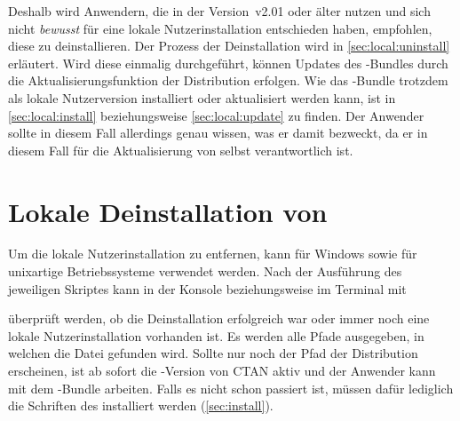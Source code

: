 Deshalb wird Anwendern, die \TUDScript in der Version~v2.01 oder älter nutzen 
und sich nicht \emph{bewusst} für eine lokale Nutzerinstallation entschieden 
haben, empfohlen, diese zu deinstallieren. Der Prozess der Deinstallation wird 
in \autoref{sec:local:uninstall} erläutert. Wird diese einmalig durchgeführt, 
können Updates des \TUDScript-Bundles durch die Aktualisierungsfunktion der 
Distribution erfolgen. Wie das \TUDScript-Bundle trotzdem als lokale 
Nutzerversion installiert oder aktualisiert werden kann, ist in 
\autoref{sec:local:install} beziehungsweise \autoref{sec:local:update} zu 
finden. Der Anwender sollte in diesem Fall allerdings genau wissen, was er 
damit bezweckt, da er in diesem Fall für die Aktualisierung von \TUDScript 
selbst verantwortlich ist.



\section{Lokale Deinstallation von \TUDScript}
\label{sec:local:uninstall}
%
Um die lokale Nutzerinstallation zu entfernen, kann für Windows
%
{} sowie für unixartige Betriebssysteme
%
{} verwendet werden. Nach der Ausführung des 
jeweiligen Skriptes kann in der Konsole beziehungsweise im Terminal mit
%
\begin{quoting}
\end{quoting}
%
überprüft werden, ob die Deinstallation erfolgreich war oder immer noch eine 
lokale Nutzerinstallation vorhanden ist. Es werden alle Pfade ausgegeben, in 
welchen die Datei  gefunden wird. Sollte nur noch der 
Pfad der Distribution erscheinen, ist ab sofort die \TUDScript-Version von CTAN 
aktiv und der Anwender kann mit dem \TUDScript-Bundle arbeiten. Falls es nicht 
schon passiert ist, müssen dafür lediglich die Schriften des \CDs installiert 
werden (\autoref{sec:install}).

